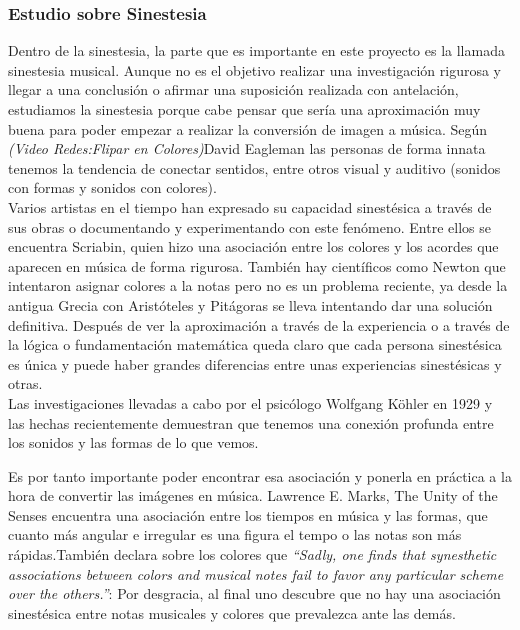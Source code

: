 \subsubsection{Estudio sobre Sinestesia}

Dentro de la sinestesia, la parte que es importante en este proyecto es la llamada sinestesia musical. Aunque no es el objetivo realizar una investigación rigurosa y llegar a una conclusión o afirmar una suposición realizada con antelación, estudiamos la sinestesia porque cabe pensar que sería una aproximación muy buena para poder empezar a realizar la conversión de imagen a música.
Según \emph{(Video Redes:Flipar en Colores)}David Eagleman las personas de forma innata  tenemos la tendencia de conectar sentidos, entre otros visual y auditivo (sonidos con formas y sonidos con colores).\\

Varios artistas en el tiempo han expresado su capacidad sinestésica a través de sus obras o documentando y experimentando con este fenómeno. Entre ellos se encuentra Scriabin, quien hizo una asociación entre los colores y los acordes que aparecen en música de forma rigurosa. También hay científicos como Newton que intentaron asignar colores a la notas pero no es un problema reciente, ya desde la antigua Grecia con Aristóteles y Pitágoras se lleva intentando dar una solución definitiva. Después de ver la aproximación a través de la experiencia o a través de la lógica o fundamentación matemática queda claro que cada persona sinestésica es única y puede haber grandes diferencias entre unas experiencias sinestésicas y otras.\\

Las investigaciones llevadas a cabo por el psicólogo Wolfgang Köhler en 1929 y las hechas recientemente demuestran que tenemos una conexión profunda entre los sonidos y las formas de lo que vemos. 


 Es por tanto importante poder encontrar esa asociación y ponerla en práctica a la hora de convertir las imágenes en música. Lawrence E. Marks, The Unity of the Senses encuentra una asociación entre los tiempos en música y las formas, que cuanto más angular e irregular es una figura el tempo o las notas son más rápidas.También declara sobre los colores que \emph{``Sadly, one finds that synesthetic associations between colors and musical notes fail to favor any particular scheme over the others.''}: Por desgracia, al final uno descubre que no hay una asociación sinestésica entre notas musicales y colores que prevalezca ante las demás.\\

